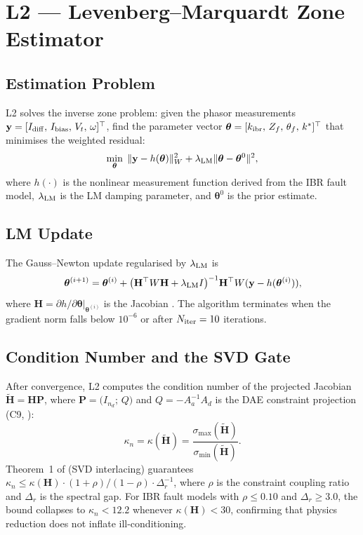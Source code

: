 \documentclass[journal,twoside,10pt]{IEEEtran}
\newcommand{\kappan}{\kappa_{n}}
\newcommand{\kibr}{k_{\rm ibr}}
\newcommand{\bfH}{\mathbf{H}}
\newcommand{\bfP}{\mathbf{P}}
\newcommand{\bfy}{\mathbf{y}}
\newcommand{\bftheta}{\bm{\theta}}
\begin{document}
\section{L2 — Levenberg--Marquardt Zone Estimator}
\label{sec:L2}

\subsection{Estimation Problem}

L2 solves the inverse zone problem: given the phasor measurements
$\bfy = [I_{\rm diff},\, I_{\rm bias},\, V_t,\, \omega]^\top$,
find the parameter vector
$\bftheta = [\kibr,\, Z_f,\, \theta_f,\, k^*]^\top$
that minimises the weighted residual:
\begin{equation}
\label{eq:lm_objective}
  \min_{\bftheta}\; \|\bfy - h(\bftheta)\|^2_W
    + \lambda_{\rm LM}\|\bftheta - \bftheta^0\|^2,
\end{equation}
where $h(\cdot)$ is the nonlinear measurement function derived from
the IBR fault model, $\lambda_{\rm LM}$ is the LM damping parameter,
and $\bftheta^0$ is the prior estimate.

\subsection{LM Update}

The Gauss--Newton update regularised by $\lambda_{\rm LM}$ is
\[
  \bftheta^{(i+1)} = \bftheta^{(i)} +
    \bigl(\bfH^\top W \bfH + \lambda_{\rm LM} I\bigr)^{-1}
    \bfH^\top W (\bfy - h(\bftheta^{(i)})),
\]
where $\bfH = \partial h/\partial \bftheta|_{\bftheta^{(i)}}$ is the
Jacobian \cite{levenberg1944method,marquardt1963algorithm}.  The
algorithm terminates when the gradient norm falls below $10^{-6}$
or after $N_{\rm iter} = 10$ iterations.

\subsection{Condition Number and the SVD Gate}
\label{sec:kappa_from_L2}

After convergence, L2 computes the condition number of the projected
Jacobian $\tilde{\bfH} = \bfH \bfP$, where
$\bfP = \bigl(I_{n_d};\, Q\bigr)$ and $Q = -A_a^{-1}A_d$ is the
DAE constraint projection (C9, \cite{sambps_c9_svd}):
\[
  \kappan = \kappa(\tilde{\bfH}) =
    \frac{\sigma_{\max}(\tilde{\bfH})}{\sigma_{\min}(\tilde{\bfH})}.
\]
Theorem~1 of \cite{sambps_c9_svd} (SVD interlacing) guarantees
$\kappan \leq \kappa(\bfH) \cdot (1+\rho)/(1-\rho) \cdot \Delta_r^{-1}$,
where $\rho$ is the constraint coupling ratio and $\Delta_r$ is the
spectral gap.  For IBR fault models with $\rho \leq 0.10$ and
$\Delta_r \geq 3.0$, the bound collapses to $\kappan < 12.2$
whenever $\kappa(\bfH) < 30$, confirming that physics reduction
does not inflate ill-conditioning.
\end{document}
